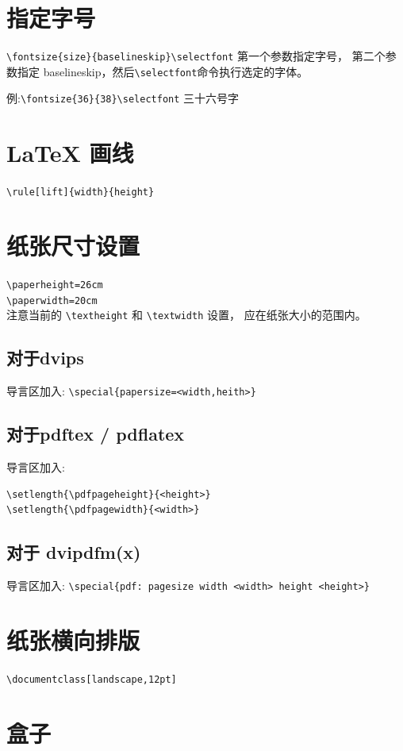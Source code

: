 \documentclass[a4paper,11pt]{article}
\begin{document}
\section{指定字号}
\verb+\fontsize{size}{baselineskip}\selectfont+ 第一个参数指定字号，
第二个参数指定 baselineskip，然后\verb+\selectfont+命令执行选定的字体。

例:\verb+\fontsize{36}{38}\selectfont+
{\fontsize{36}{38}\selectfont 三十六号字}

\section{\LaTeX{} 画线}
\verb+\rule[lift]{width}{height}+

\section{纸张尺寸设置}
\verb+\paperheight=26cm+\\
\verb+\paperwidth=20cm+\\

注意当前的 \verb+\textheight+ 和 \verb+\textwidth+ 设置，
应在纸张大小的范围内。

\subsection{对于dvips}
导言区加入: \verb+\special{papersize=<width,heith>}+

\subsection{对于pdftex / pdflatex}
导言区加入: 
\begin{Verbatim}
\setlength{\pdfpageheight}{<height>} 
\setlength{\pdfpagewidth}{<width>} 
\end{Verbatim}

\subsection{对于 dvipdfm(x)}
导言区加入: \verb+\special{pdf: pagesize width <width> height <height>}+

\section{纸张横向排版}
\verb+\documentclass[landscape,12pt]+

\section{盒子}
\end{document}
